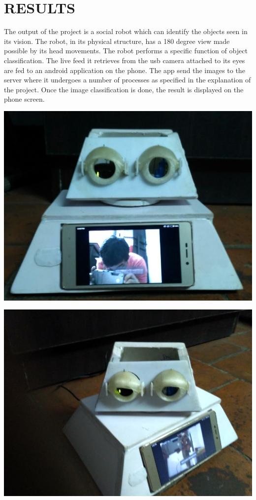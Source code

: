 \documentclass{fisatproject}
\begin{document}
\chapter{RESULTS}
The output of the project is a social robot which can identify the objects seen in its vision. The robot, in its physical structure, has a 180 degree view made possible by its head movements.\newline\newline
The robot performs a specific function of object classification. The live feed it retrieves from the usb camera attached to its eyes are fed to an android application on the phone. The app send the images to the server where it undergoes a number of processes as specified in the explanation of the project. Once the image classification is done, the result is displayed on the phone screen.\newline\newline
\begin{center}
\includegraphics[scale=0.1]{real_front.jpg}
\end{center}   
\begin{center}
\includegraphics[scale=0.1]{real_side.jpg}
\end{center}   
\end{document}

